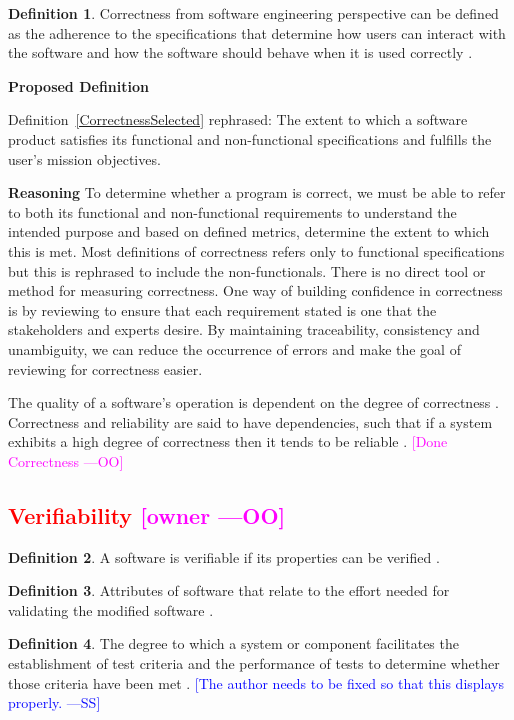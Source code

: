 \documentclass[letterpaper,cleveref]{lipics-v2019}
\newcommand{\authornote}[3]{\textcolor{#1}{[#3 ---#2]}}
\newcommand{\authornote}[3]{}
\newcommand{\wss}[1]{\authornote{blue}{SS}{#1}} %
\newcommand{\oo}[1]{\authornote{magenta}{OO}{#1}} %
\newcommand{\notdone}[1]{\textcolor{red}{#1}}
\theoremstyle{definition}
\newtheorem{defn}{Definition}
\begin{document}
\begin{defn}
	Correctness from software engineering perspective can be defined as the adherence to the specifications that determine how users can interact with the software and how the software should behave when it is used correctly \citep{Tutorialspoint}.
\end{defn}

\noindent \textbf{Proposed Definition}

Definition~\ref{CorrectnessSelected} rephrased: The extent to which a software product satisfies its functional and non-functional specifications and fulfills the
user's mission objectives.

\noindent \textbf{Reasoning}
To determine whether a program is correct, we must be able to refer to both its functional and non-functional requirements to understand the intended purpose and based on defined metrics, determine the extent to which this is met. Most definitions of correctness refers only to functional specifications but this is rephrased to include the non-functionals.
There is no direct tool or method for measuring correctness. One way of building
confidence in correctness is by reviewing to ensure that each requirement stated
is one that the stakeholders and experts desire.  By maintaining traceability,
consistency and unambiguity, we can reduce the occurrence of errors and make the
goal of reviewing for correctness easier.

The quality of a software's operation is dependent on the degree of correctness
\citep{berander2005software}. Correctness and reliability are said to have
dependencies, such that if a system exhibits a high degree of correctness then
it tends to be reliable \citep{GhezziEtAl2003}. \oo{Done Correctness}
\subsection{\notdone{Verifiability} \oo{owner}}

\begin{defn}
	A software is verifiable if its properties can be verified
	\citep{GhezziEtAl2003}.
\end{defn}

\begin{defn}
	Attributes of software that relate to the effort needed for validating the
	modified software \citep{berander2005software}.
\end{defn}

\begin{defn}
	The degree to which a system or component facilitates the establishment of
	test criteria and the performance of tests to determine whether those criteria
	have been met \citep{IEEEStdGlossarySET1990}. \wss{The author needs to be
		fixed so that this displays properly.}
\end{defn}
\end{document}
